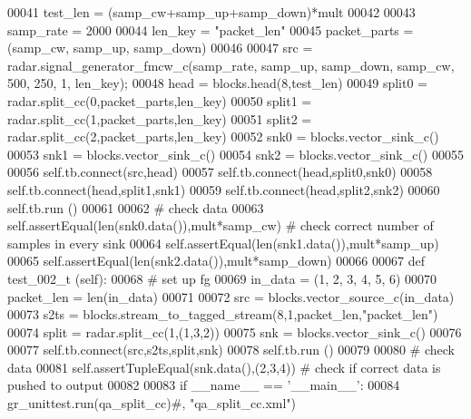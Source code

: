 \begin{DoxyCode}
00041         test\_len = (samp\_cw+samp\_up+samp\_down)*mult
00042         
00043         samp\_rate = 2000
00044         len\_key = \textcolor{stringliteral}{"packet\_len"}
00045         packet\_parts = (samp\_cw, samp\_up, samp\_down)
00046         
00047         src = radar.signal\_generator\_fmcw\_c(samp\_rate, samp\_up, samp\_down, samp\_cw, 500, 250, 1, len\_key);
00048         head = blocks.head(8,test\_len)
00049         split0 = radar.split\_cc(0,packet\_parts,len\_key)
00050         split1 = radar.split\_cc(1,packet\_parts,len\_key)
00051         split2 = radar.split\_cc(2,packet\_parts,len\_key)
00052         snk0 = blocks.vector\_sink\_c()
00053         snk1 = blocks.vector\_sink\_c()
00054         snk2 = blocks.vector\_sink\_c()
00055         
00056         self.tb.connect(src,head)
00057         self.tb.connect(head,split0,snk0)
00058         self.tb.connect(head,split1,snk1)
00059         self.tb.connect(head,split2,snk2)
00060         self.tb.run ()
00061         
00062         \textcolor{comment}{# check data}
00063         self.assertEqual(len(snk0.data()),mult*samp\_cw) \textcolor{comment}{# check correct number of samples in every sink}
00064         self.assertEqual(len(snk1.data()),mult*samp\_up)
00065         self.assertEqual(len(snk2.data()),mult*samp\_down)
00066         
00067     \textcolor{keyword}{def }test_002_t (self):
00068         \textcolor{comment}{# set up fg}
00069         in\_data = (1, 2, 3, 4, 5, 6)
00070         packet\_len = len(in\_data)
00071         
00072         src = blocks.vector\_source\_c(in\_data)
00073         s2ts = blocks.stream\_to\_tagged\_stream(8,1,packet\_len,\textcolor{stringliteral}{"packet\_len"})
00074         split = radar.split\_cc(1,(1,3,2))
00075         snk = blocks.vector\_sink\_c()
00076         
00077         self.tb.connect(src,s2ts,split,snk)
00078         self.tb.run ()
00079         
00080         \textcolor{comment}{# check data}
00081         self.assertTupleEqual(snk.data(),(2,3,4)) \textcolor{comment}{# check if correct data is pushed to output}
00082 
00083 \textcolor{keywordflow}{if} \_\_name\_\_ == \textcolor{stringliteral}{'\_\_main\_\_'}:
00084     gr\_unittest.run(qa\_split\_cc)\textcolor{comment}{#, "qa\_split\_cc.xml")}
\end{DoxyCode}
